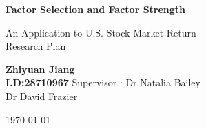 \begin{titlepage}
\begin{center}
\vspace*{1cm}
\Huge
\textbf{Factor Selection and Factor Strength}

\vspace{0.5cm}
\LARGE
An Application to U.S. Stock Market Return\\
\Large
Research Plan 

\vspace{1.5 cm}
\textbf{Zhiyuan Jiang\\I.D:28710967}
\vfill
 Supervisor : Dr Natalia Bailey\\\hspace{31mm} Dr David Frazier
 \vspace{0.8cm}
 
\Large
\today
\end{center}
\end{titlepage}